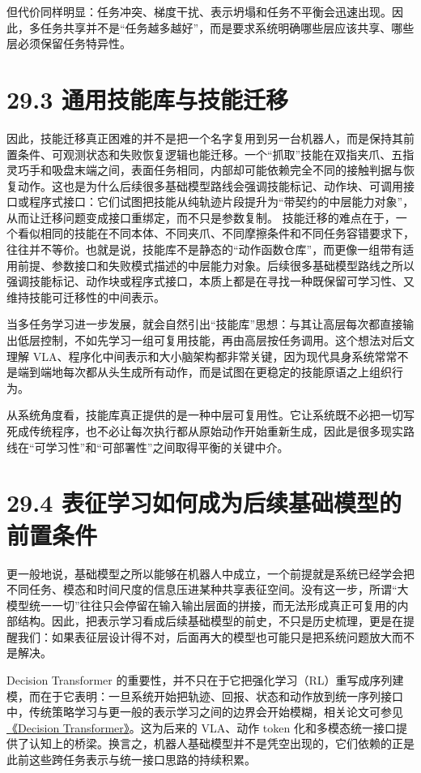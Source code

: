 但代价同样明显：任务冲突、梯度干扰、表示坍塌和任务不平衡会迅速出现。因此，多任务共享并不是“任务越多越好”，而是要求系统明确哪些层应该共享、哪些层必须保留任务特异性。

\section*{29.3 通用技能库与技能迁移}


因此，技能迁移真正困难的并不是把一个名字复用到另一台机器人，而是保持其前置条件、可观测状态和失败恢复逻辑也能迁移。一个“抓取”技能在双指夹爪、五指灵巧手和吸盘末端之间，表面任务相同，内部却可能依赖完全不同的接触判据与恢复动作。这也是为什么后续很多基础模型路线会强调技能标记、动作块、可调用接口或程序式接口：它们试图把技能从纯轨迹片段提升为“带契约的中层能力对象”，从而让迁移问题变成接口重绑定，而不只是参数复制。 技能迁移的难点在于，一个看似相同的技能在不同本体、不同夹爪、不同摩擦条件和不同任务容错要求下，往往并不等价。也就是说，技能库不是静态的“动作函数仓库”，而更像一组带有适用前提、参数接口和失败模式描述的中层能力对象。后续很多基础模型路线之所以强调技能标记、动作块或程序式接口，本质上都是在寻找一种既保留可学习性、又维持技能可迁移性的中间表示。

当多任务学习进一步发展，就会自然引出“技能库”思想：与其让高层每次都直接输出低层控制，不如先学习一组可复用技能，再由高层按任务调用。这个想法对后文理解 VLA、程序化中间表示和大小脑架构都非常关键，因为现代具身系统常常不是端到端地每次都从头生成所有动作，而是试图在更稳定的技能原语之上组织行为。

从系统角度看，技能库真正提供的是一种中层可复用性。它让系统既不必把一切写死成传统程序，也不必让每次执行都从原始动作开始重新生成，因此是很多现实路线在“可学习性”和“可部署性”之间取得平衡的关键中介。

\section*{29.4 表征学习如何成为后续基础模型的前置条件}


更一般地说，基础模型之所以能够在机器人中成立，一个前提就是系统已经学会把不同任务、模态和时间尺度的信息压进某种共享表征空间。没有这一步，所谓“大模型统一一切”往往只会停留在输入输出层面的拼接，而无法形成真正可复用的内部结构。因此，把表示学习看成后续基础模型的前史，不只是历史梳理，更是在提醒我们：如果表征层设计得不对，后面再大的模型也可能只是把系统问题放大而不是解决。

Decision Transformer 的重要性，并不只在于它把强化学习（RL）重写成序列建模，而在于它表明：一旦系统开始把轨迹、回报、状态和动作放到统一序列接口中，传统策略学习与更一般的表示学习之间的边界会开始模糊，相关论文可参见 \href{https://arxiv.org/abs/2106.01345}{《Decision Transformer》}。这为后来的 VLA、动作 token 化和多模态统一接口提供了认知上的桥梁。换言之，机器人基础模型并不是凭空出现的，它们依赖的正是此前这些跨任务表示与统一接口思路的持续积累。

